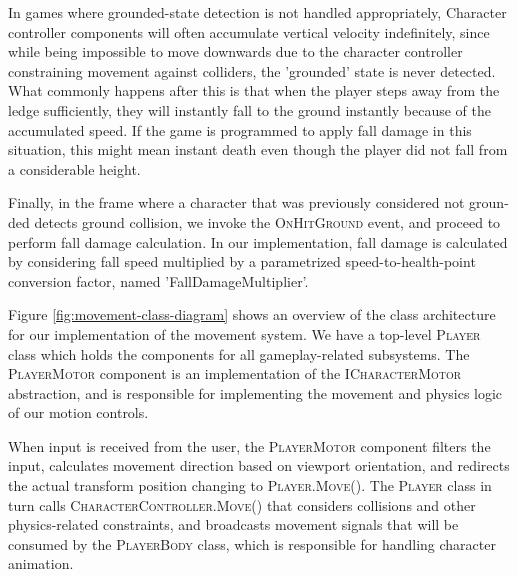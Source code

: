 
In games where grounded-state detection is not handled appropriately, Character controller components will often accumulate vertical velocity indefinitely, since while being impossible to move downwards due to the character controller constraining movement against colliders, the 'grounded' state is never detected. What commonly happens after this is that when the player steps away from the ledge sufficiently, they will instantly fall to the ground instantly because of the accumulated speed. If the game is programmed to apply fall damage in this situation, this might mean instant death even though the player did not fall from a considerable height.

Finally, in the frame where a character that was previously considered not groun\hyp{}ded detects ground collision, we invoke the \textsc{OnHitGround} event, and proceed to perform fall damage calculation. In our implementation, fall damage is calculated by considering fall speed multiplied by a parametrized speed-to-health-point conversion factor, named 'FallDamageMultiplier'.

Figure \ref{fig:movement-class-diagram} shows an overview of the class architecture for our implementation of the movement system. We have a top-level \textsc{Player} class which holds the components for all gameplay-related subsystems. The \textsc{PlayerMotor} component is an implementation of the \textsc{ICharacterMotor} abstraction, and is responsible for implementing the movement and physics logic of our motion controls.

When input is received from the user, the \textsc{PlayerMotor} component filters the input, calculates movement direction based on viewport orientation, and redirects the actual transform position changing to \textsc{Player.Move()}. The \textsc{Player} class in turn calls \textsc{CharacterController.Move()} that considers collisions and other physics-related constraints, and broadcasts movement signals that will be consumed by the \textsc{PlayerBody} class, which is responsible for handling character animation.




